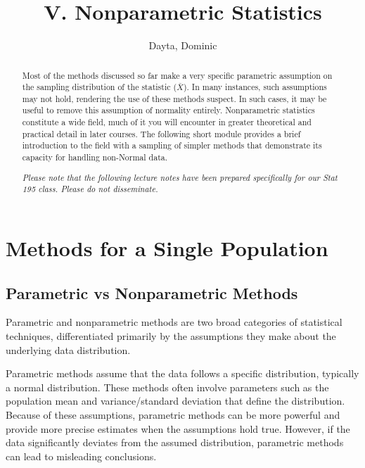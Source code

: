 \documentclass{article}
\title{V. Nonparametric Statistics}
\author{Dayta, Dominic}
\begin{document}
\begin{titlepage}
\thispagestyle{empty}
\maketitle

\begin{abstract}
Most of the methods discussed so far make a very specific parametric assumption on the sampling distribution of the statistic ($\bar{X}$). In many instances, such assumptions may not hold, rendering the use of these methods suspect. In such cases, it may be useful to remove this assumption of normality entirely. Nonparametric statistics constitute a wide field, much of it you will encounter in greater theoretical and practical detail in later courses. The following short module provides a brief introduction to the field with a sampling of simpler methods that demonstrate its capacity for handling non-Normal data.

\textit{Please note that the following lecture notes have been prepared specifically for our Stat 195 class. Please do not disseminate.}
\end{abstract}

\tableofcontents
\end{titlepage}



\section{Methods for a Single Population}

\subsection{Parametric vs Nonparametric Methods}

Parametric and nonparametric methods are two broad categories of statistical techniques, differentiated primarily by the assumptions they make about the underlying data distribution.

Parametric methods assume that the data follows a specific distribution, typically a normal distribution. These methods often involve parameters such as the population mean and variance/standard deviation that define the distribution. Because of these assumptions, parametric methods can be more powerful and provide more precise estimates when the assumptions hold true. However, if the data significantly deviates from the assumed distribution, parametric methods can lead to misleading conclusions.
\end{document}
